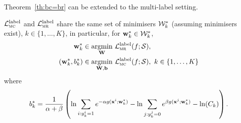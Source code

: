 Theorem~\ref{th:bc=br} can be extended to the multi-label setting.
\begin{theorem}
\label{theorem:mc1=mr1}
$\mathcal{L}_\textsc{mc}^\mathrm{label}$ and $\mathcal{L}_\textsc{mr}^\mathrm{label}$ share the same set of minimisers $\mathcal{W}_k^*$
(assuming minimisers exist), $k \in \{1,\dots,K\}$, in particular, for $\mathbf{w}_k^* \in \mathcal{W}_k^*$,
\begin{equation*}
\begin{aligned}
         \mathbf{w}_k^* & \in \operatorname*{argmin}_{\mathbf{W}}     \, \mathcal{L}_\textsc{mr}^\mathrm{label}(f; \mathcal{S}), \\
(\mathbf{w}_k^*, b_k^*) & \in \operatorname*{argmin}_{\mathbf{W},\mathbf{b}} \, \mathcal{L}_\textsc{mc}^\mathrm{label}(f; \mathcal{S}), \ k \in \{1,\dots,K\}
\end{aligned}
\end{equation*}
where
$$
b_k^*
= \frac{1}{\alpha + \beta} \left(
  \ln \sum_{i: y_k^i = 1} e^{-\alpha g(\mathbf{x}^i; \mathbf{w}_k^*)} - \ln \sum_{j: y_k^j = 0} e^{\beta g(\mathbf{x}^j; \mathbf{w}_k^*)} - \ln (C_k) \right).
$$
\end{theorem}
